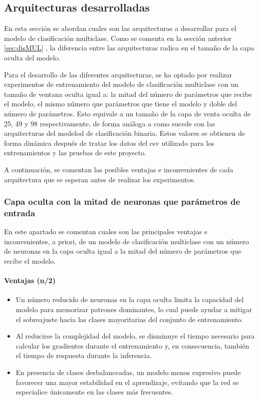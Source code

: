 \subsection{Arquitecturas desarrolladas}
En esta sección se abordan cuales son las arquitecturas a desarrollar para el modelo de clasificación multiclase. Como se comenta en la sección anterior \ref{sec:disMUL} , la diferencia entre las arquitecturas radica en el tamaño de la capa oculta del modelo.

Para el desarrollo de las diferentes arquitecturas, se ha optado por realizar experimentos de entrenamiento del modelo de clasificación multiclase con un tamaño de ventana oculta igual a:
la mitad del número de parámetros que recibe el modelo, el mismo número que parámetros que tiene el modelo y doble del número de parámetros. Esto equivale a un tamaño de la capa de venta oculta de 25, 49 y 98 respectivamente, de forma análoga a como sucede con las arquitecturas del modelod de clasificación binaria. Estos valores se obtienen de forma dinámica después de tratar los datos del csv utilizado para los entrenamientos y las pruebas de este proyecto.

A continuación, se comentan las posibles ventajas e inconvenientes de cada arquitectura que se esperan antes de realizar los experimentos.

\subsubsection{Capa oculta con la mitad de neuronas que parámetros de entrada}\label{sec:VIMUL25}
En este apartado se comentan cuales son las principales ventajas e inconvenientes, a priori, de un modelo de clasificación multiclase con un número de neuronas en la capa oculta igual a la mitad del número de parámetros que recibe el modelo.

\paragraph{Ventajas (n/2)}
\begin{itemize}
	\item Un número reducido de neuronas en la capa oculta limita la capacidad del modelo para memorizar patrones dominantes, lo cual puede ayudar a mitigar el sobreajuste hacia las clases mayoritarias del conjunto de entrenamiento.
	\item Al reducirse la complejidad del modelo, se disminuye el tiempo necesario para calcular los gradientes durante el entrenamiento y, en consecuencia, también el tiempo de respuesta durante la inferencia.
	\item En presencia de clases desbalanceadas, un modelo menos expresivo puede favorecer una mayor estabilidad en el aprendizaje, evitando que la red se especialice únicamente en las clases más frecuentes.

\end{itemize}
